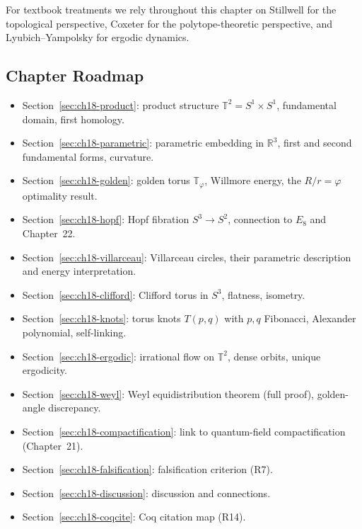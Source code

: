 For textbook treatments we rely throughout this chapter on
Stillwell \cite{Stillwell1992} for the topological perspective,
Coxeter \cite{Coxeter1973} for the polytope-theoretic perspective, and
Lyubich--Yampolsky \cite{LyubichYampolsky2011} for ergodic dynamics.

\subsection{Chapter Roadmap}\label{subsec:ch18-roadmap}

\begin{itemize}
\item Section~\ref{sec:ch18-product}: product structure $\mathbb{T}^2 = S^1 \times S^1$,
  fundamental domain, first homology.
\item Section~\ref{sec:ch18-parametric}: parametric embedding in $\mathbb{R}^3$,
  first and second fundamental forms, curvature.
\item Section~\ref{sec:ch18-golden}: golden torus $\mathbb{T}_\varphi$,
  Willmore energy, the $R/r = \varphi$ optimality result.
\item Section~\ref{sec:ch18-hopf}: Hopf fibration $S^3 \to S^2$, connection
  to $E_8$ and Chapter~22.
\item Section~\ref{sec:ch18-villarceau}: Villarceau circles, their parametric
  description and energy interpretation.
\item Section~\ref{sec:ch18-clifford}: Clifford torus in $S^3$, flatness, isometry.
\item Section~\ref{sec:ch18-knots}: torus knots $T(p,q)$ with $p,q$ Fibonacci,
  Alexander polynomial, self-linking.
\item Section~\ref{sec:ch18-ergodic}: irrational flow on $\mathbb{T}^2$,
  dense orbits, unique ergodicity.
\item Section~\ref{sec:ch18-weyl}: Weyl equidistribution theorem (full proof),
  golden-angle discrepancy.
\item Section~\ref{sec:ch18-compactification}: link to quantum-field
  compactification (Chapter~21).
\item Section~\ref{sec:ch18-falsification}: falsification criterion (R7).
\item Section~\ref{sec:ch18-discussion}: discussion and connections.
\item Section~\ref{sec:ch18-coqcite}: Coq citation map (R14).
\end{itemize}

